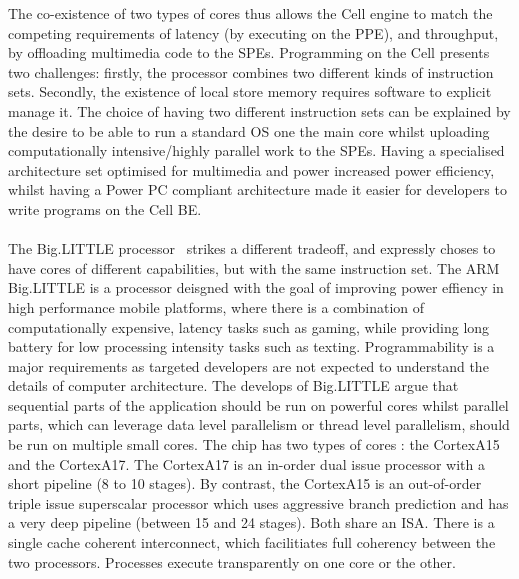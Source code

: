 The co-existence of two types of cores thus allows the Cell engine to match
the competing requirements of latency (by executing on the PPE),
and throughput, by offloading multimedia code to the SPEs. 
Programming on the Cell presents two challenges: firstly, the processor
combines two different kinds of instruction sets. Secondly, the existence of 
local store memory requires software to explicit manage it. 
The choice of having two different instruction sets can be explained 
by the desire to be able to run a standard OS one the main 
core whilst uploading computationally intensive/highly parallel work 
to the SPEs. Having a specialised architecture set optimised for multimedia
 and power increased power efficiency, whilst having a Power PC compliant 
architecture made it easier for developers to write programs on the Cell BE.  

\paragraph{} The Big.LITTLE processor~\cite{greenhalgh2011biglittle} strikes 
a different tradeoff, and expressly choses to have cores of different capabilities, but
with the same instruction set. The ARM Big.LITTLE is a processor
deisgned with the goal of improving power effiency in high
performance mobile platforms, where there is a combination
of computationally expensive, latency tasks such as gaming, 
while providing long battery for low processing intensity tasks such
as texting. Programmability is a major requirements as targeted developers
are not expected to understand the details of computer architecture. 
The develops of Big.LITTLE argue that sequential parts of the application 
should be run on powerful cores whilst parallel parts, which can leverage data
level parallelism or thread level parallelism, should be run
on multiple small cores. The chip has two types of cores
: the CortexA15 and the CortexA17. The CortexA17 is an in-order dual issue
processor with a short pipeline (8 to 10 stages). By contrast,  the CortexA15
 is an out-of-order triple issue superscalar processor
which uses aggressive branch prediction and has a very deep pipeline
(between 15 and 24 stages). Both share an ISA. There is a single cache
coherent interconnect, which facilitiates full coherency between the 
two processors. Processes execute transparently on one core or the other.

